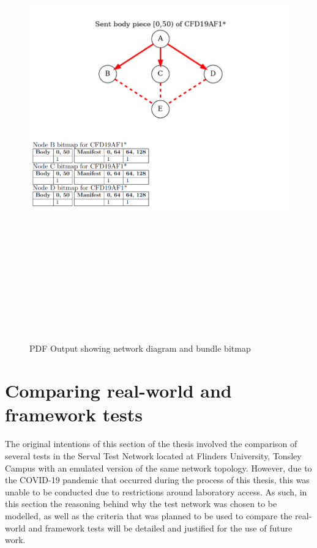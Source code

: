 \begin{figure}
    \begin{centering}
        \includegraphics[width=15cm,height=20cm,keepaspectratio]{Figures/Chapter6-PDFPartition.png}
        \caption{PDF Output showing network diagram and bundle bitmap}
        \label{fig:chapter6PDFPartition}
    \end{centering}
\end{figure}

\section{Comparing real-world and framework tests}
The original intentions of this section of the thesis involved the comparison of several tests in the Serval Test Network located at Flinders University, Tonsley Campus with an emulated version of the same network topology.
However, due to the COVID-19 pandemic that occurred during the process of this thesis, this was unable to be conducted due to restrictions around laboratory access.
As such, in this section the reasoning behind why the test network was chosen to be modelled, as well as the criteria that was planned to be used to compare the real-world and framework tests will be detailed and justified for the use of future work.


